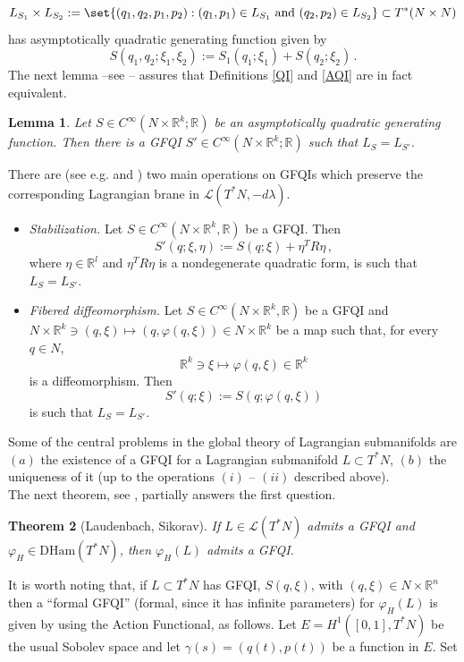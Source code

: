 \documentclass{article}
\newcommand{\1}{\mathbbm{1}}
\newcommand{\numberset}{\mathbb}
\newcommand{\R}{\numberset{R}}
\newtheorem{thm}{Theorem}[section]
\newtheorem{lem}[thm]{Lemma}
\theoremstyle{remark}
\renewcommand{\phi}{\varphi}
\begin{document}
{{{{$$L_{S_1} \times L_{S_2} := \set{ (q_1,q_2,p_1,p_2): (q_1,p_1) \in L_{S_1} \text{ and } (q_2,p_2) \in L_{S_2}} \subset T^*(N \times N)$$
has asymptotically quadratic generating function given by 
$$S(q_1,q_2; \xi_1,\xi_2) := S_1(q_1;\xi_1) + S(q_2;\xi_2)\, .$$
The next lemma --see \cite[Proposition 2.12]{the99}-- assures that Definitions \ref{QI} and \ref{AQI} are in fact equivalent.
\begin{lem} \label{serve dopo 1}
Let $S \in C^\infty(N\times \R^k;\R)$ be an asymptotically quadratic generating function. Then there is a GFQI $S' \in C^\infty(N\times \R^k;\R)$ such that $L_S = L_{S'}$.
\end{lem}}}
\indent There are (see e.g. \cite{Hor} and \cite{Wei}) two main operations on GFQIs which preserve the corresponding Lagrangian brane in $\mathscr{L}(T^*N,-d\lambda)$. 
\begin{itemize}
\item[$(i)$] \textit{Stabilization.} Let $S \in C^{\infty}(N\times \mathbb{R}^k,\mathbb{R})$ be a GFQI. Then
$$S'(q;\xi,\eta) := S(q;\xi) + \eta^T R \eta\, ,$$
where $\eta \in \mathbb{R}^l$ and $\eta^T R \eta$ is a nondegenerate quadratic form, is such that $L_S = L_{S'}$.
\item[$(ii)$] \textit{Fibered diffeomorphism.}  Let $S \in C^{\infty}(N\times \mathbb{R}^k,\mathbb{R})$ be a GFQI and $N \times \mathbb{R}^k \ni (q,\xi) \mapsto (q,\phi(q,\xi)) \in N \times \mathbb{R}^k$ be a map such that, for every $q \in N$,
$$\mathbb{R}^k \ni \xi \mapsto \phi(q,\xi) \in \mathbb{R}^k$$
is a diffeomorphism. Then 
$$S'(q;\xi) := S(q;\phi(q,\xi))$$
is such that $L_S = L_{S'}$.
\end{itemize}
\indent Some of the central problems in the global theory of Lagrangian submanifolds are $(a)$ the existence of a GFQI for a Lagrangian submanifold $L \subset T^*N$, $(b)$ the uniqueness of it (up to the operations $(i)$ -- $(ii)$ described above). \\
The next theorem, see \cite{Sik}, partially answers the first question.
\begin{thm}[Laudenbach, Sikorav] \label{thm:lauSik}
If $L \in \mathscr{L}(T^*N)$ admits a GFQI and $\varphi_H \in \mathrm{DHam}(T^*N)$, then $\varphi_H(L)$ admits a GFQI.
\end{thm}
\noindent It is worth noting that, if $L \subset T^*N$ has GFQI, $S(q,\xi)$, with $(q,\xi) \in N \times \mathbb{R}^n$ then a ``formal GFQI'' (formal, since it has infinite parameters) for $\varphi_H(L)$ is given by using the Action Functional, as follows. 
Let $E = H^1([0,1], T^*N)$ be the usual Sobolev space and let $\gamma(s) = (q(t),p(t))$ be a function in $E$. Set
}}
\end{document}
